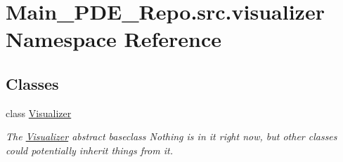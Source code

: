 \hypertarget{namespaceMain__PDE__Repo_1_1src_1_1visualizer}{}\section{Main\+\_\+\+P\+D\+E\+\_\+\+Repo.\+src.\+visualizer Namespace Reference}
\label{namespaceMain__PDE__Repo_1_1src_1_1visualizer}
\subsection*{Classes}
\begin{DoxyCompactItemize}
\item 
class \hyperlink{classMain__PDE__Repo_1_1src_1_1visualizer_1_1Visualizer}{Visualizer}
\begin{DoxyCompactList}\small\item\em The \hyperlink{classMain__PDE__Repo_1_1src_1_1visualizer_1_1Visualizer}{Visualizer} abstract baseclass Nothing is in it right now, but other classes could potentially inherit things from it. \end{DoxyCompactList}\end{DoxyCompactItemize}
